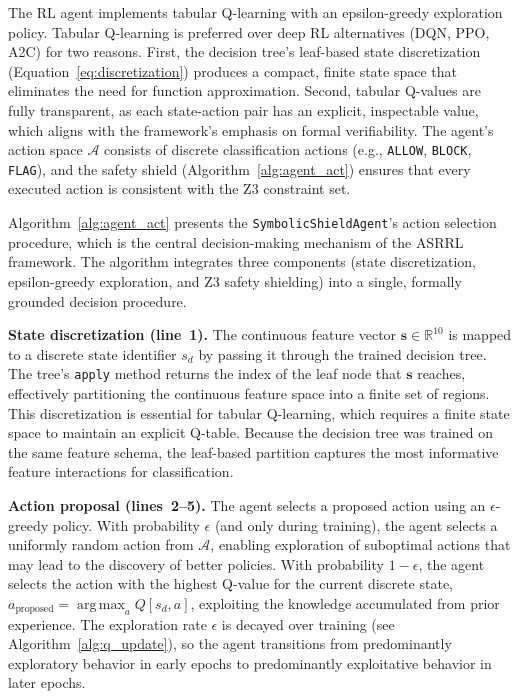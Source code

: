 \documentclass[12pt, letterpaper, oneside]{report}
\newcommand{\ASRRL}{\textsc{ASRRL}}
\newcommand{\argmax}{\operatorname*{arg\,max}}
\newcommand{\R}{\mathbb{R}}
\newcommand{\bs}{\mathbf{s}}
\begin{document}
The RL agent implements tabular Q-learning with an epsilon-greedy exploration policy. Tabular Q-learning is preferred over deep RL alternatives (DQN, PPO, A2C) for two reasons. First, the decision tree's leaf-based state discretization (Equation~\ref{eq:discretization}) produces a compact, finite state space that eliminates the need for function approximation. Second, tabular Q-values are fully transparent, as each state-action pair has an explicit, inspectable value, which aligns with the framework's emphasis on formal verifiability. The agent's action space $\mathcal{A}$ consists of discrete classification actions (e.g., \texttt{ALLOW}, \texttt{BLOCK}, \texttt{FLAG}), and the safety shield (Algorithm~\ref{alg:agent_act}) ensures that every executed action is consistent with the Z3 constraint set.

Algorithm~\ref{alg:agent_act} presents the \texttt{SymbolicShieldAgent}'s action selection procedure, which is the central decision-making mechanism of the \ASRRL{} framework. The algorithm integrates three components (state discretization, epsilon-greedy exploration, and Z3 safety shielding) into a single, formally grounded decision procedure.

\textbf{State discretization (line~1).} The continuous feature vector $\bs \in \R^{10}$ is mapped to a discrete state identifier $s_d$ by passing it through the trained decision tree. The tree's \texttt{apply} method returns the index of the leaf node that $\bs$ reaches, effectively partitioning the continuous feature space into a finite set of regions. This discretization is essential for tabular Q-learning, which requires a finite state space to maintain an explicit Q-table. Because the decision tree was trained on the same feature schema, the leaf-based partition captures the most informative feature interactions for classification.

\textbf{Action proposal (lines~2--5).} The agent selects a proposed action using an $\epsilon$-greedy policy. With probability $\epsilon$ (and only during training), the agent selects a uniformly random action from $\mathcal{A}$, enabling exploration of suboptimal actions that may lead to the discovery of better policies. With probability $1 - \epsilon$, the agent selects the action with the highest Q-value for the current discrete state, $a_{\text{proposed}} = \argmax_a Q[s_d, a]$, exploiting the knowledge accumulated from prior experience. The exploration rate $\epsilon$ is decayed over training (see Algorithm~\ref{alg:q_update}), so the agent transitions from predominantly exploratory behavior in early epochs to predominantly exploitative behavior in later epochs.
\end{document}
